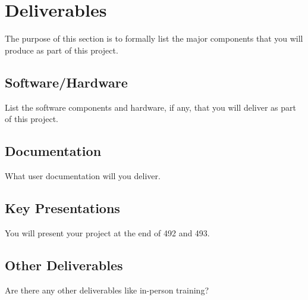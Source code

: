 \section{Deliverables}
 The purpose of this section is to formally list the major components that you
 will produce as part of this project.  

\subsection{Software/Hardware}
 List the software components and hardware, if any, that you will deliver as
 part of this project.  

\subsection{Documentation}
 What user documentation will you deliver.

\subsection{Key Presentations}
 You will present your project at the end of 492 and 493.

\subsection{Other Deliverables}
 Are there any other deliverables like in-person training?
